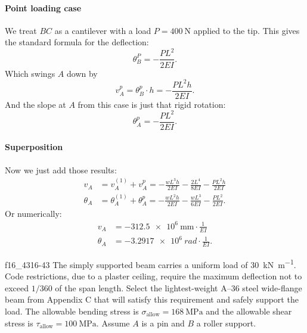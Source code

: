 \begin{derivation}
  \paragraph{Point loading case}
  We treat $BC$ as a cantilever with a load $P = \qty{400}{\N}$ applied to the tip.
  This gives the standard formula for the deflection:
  \begin{equation*}
    \theta_B^{P} = - \frac{PL^2}{2EI}
  .\end{equation*}
  Which swings $A$ down by
  \begin{equation*}
    v_A^{p} = \theta_B^{p} \cdot h = - \frac{PL^2h}{2EI}
  .\end{equation*}
  And the slope at $A$ from this case is just that rigid rotation:
  \begin{equation*}
    \theta_A^{p} = - \frac{PL^2}{2EI}
  .\end{equation*}
  
  \paragraph{Superposition}
  Now we just add those results:
  \begin{align*}
    v_A &= v_A^{(1)} + v_A^{p} = - \frac{wL^3h}{2EI} - \frac{2L^{4}}{8EI} - \frac{PL^2h}{2EI} \\
    \theta_{A} &= \theta_A^{(1)} + \theta_A^{p} = - \frac{wL^2h}{2EI} - \frac{wL^3}{6EI} - \frac{PL^2}{2EI}
  .\end{align*}
  Or numerically:
  \begin{align*}
    v_A &= - \qty{312,5e6}{\mm} \cdot \frac{1}{EI} \\
    \theta_A &= - \qty{3,2917e6}{rad} \cdot \frac{1}{EI}
  .\end{align*}
\end{derivation}


\begin{problemwithimage}{f16_43}{16-43}
  The simply supported beam carries a uniform load of \qty{30}{\kN\per\m}.
  Code restrictions, due to a plaster ceiling, require the maximum deflection not to exceed $1 / 360$ of the span length.
  Select the lightest-weight A--36 steel wide-flange beam from Appendix C that will satisfy this requirement and safely support the load.
  The allowable bending stress is $\sigma_{\mathrm{allow}} = \qty{168}{\MPa} $ and the allowable shear stress is $\tau_{\mathrm{allow}} = \qty{100}{\MPa}$.
  Assume $A$ is a pin and $B$ a roller support.
\end{problemwithimage}

